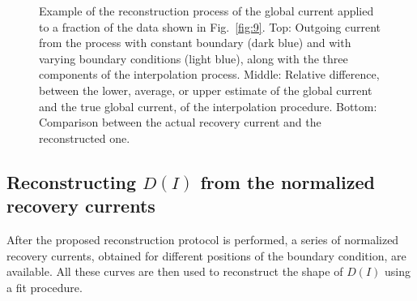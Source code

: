 \begin{figure}[p]
    \caption{Example of the reconstruction process of the global current applied to a fraction of the data shown in Fig.~\ref{fig:9}. Top: Outgoing current from the process with constant boundary (dark blue) and with varying boundary conditions (light blue), along with the three components of the interpolation process. Middle: Relative difference, between the lower, average, or upper estimate of the global current and the true global current, of the interpolation procedure. Bottom: Comparison between the actual recovery current and the reconstructed one.}
    \label{fig:protocol}
\end{figure}


\subsection{Reconstructing $D(I)$ from the normalized recovery currents}


After the proposed reconstruction protocol is performed, a series of normalized recovery currents, obtained for different positions of the boundary condition, are available. All these curves are then used to reconstruct the shape of $D(I)$ using a fit procedure.

